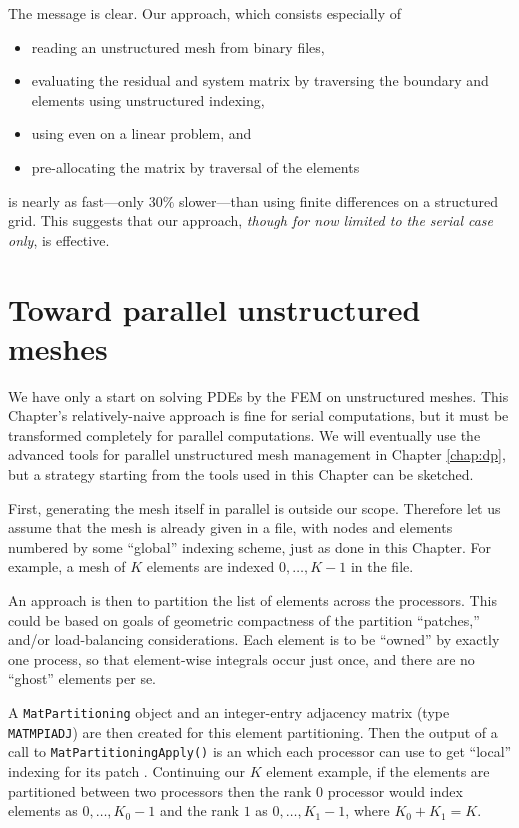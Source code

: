 The message is clear.  Our approach, which consists especially of
\begin{itemize}
\item reading an unstructured mesh from \PETSc binary files,
\item evaluating the residual and system matrix by traversing the boundary and elements using unstructured indexing,
\item using \pSNES even on a linear problem, and
\item pre-allocating the matrix by traversal of the elements
\end{itemize}
is nearly as fast---only $30\%$ slower---than using finite differences on a \pDMDA structured grid.  This suggests that our approach, \emph{though for now limited to the serial case only}, is effective.


\section{Toward parallel unstructured meshes}

We have only a start on solving PDEs by the FEM on unstructured meshes.  This Chapter's relatively-naive approach is fine for serial computations, but it must be transformed completely for parallel computations.  We will eventually use the advanced \PETSc tools for parallel unstructured mesh management in Chapter \ref{chap:dp}, but a strategy starting from the tools used in this Chapter can be sketched.

First, generating the mesh itself in parallel is outside our scope.  Therefore let us assume that the mesh is already given in a file, with nodes and elements numbered by some ``global'' indexing scheme, just as done in this Chapter.  For example, a mesh of $K$ elements are indexed $0,\dots,K-1$ in the file.

An approach is then to partition the list of elements across the processors.  This could be based on goals of geometric compactness of the partition ``patches,'' and/or load-balancing considerations.  Each element is to be ``owned'' by exactly one process, so that element-wise integrals occur just once, and there are no ``ghost'' elements per se.

A \texttt{MatPartitioning} object and an integer-entry adjacency matrix (type \texttt{MATMPIADJ}) are then created for this element partitioning.  Then the output of a call to \texttt{MatPartitioningApply()} is an \pIS which each processor can use to get ``local'' indexing for its patch \citep{petsc-user-ref}.  Continuing our $K$ element example, if the elements are partitioned between two processors then the rank $0$ processor would index elements as $0,\dots,K_0-1$ and the rank $1$ as $0,\dots,K_1-1$, where $K_0+K_1=K$.

